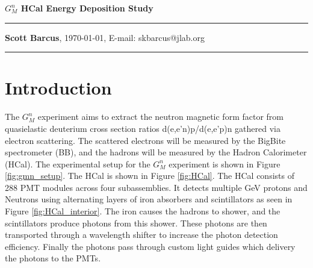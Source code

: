 \documentclass[10pt]{article}
\date{}
\begin{document}
\begin{flushleft}
{\Large
\textbf{$G_M^n$ HCal Energy Deposition Study}
}
\\
\vspace{4mm}
\hrule height 0.8pt \relax
\vspace{2mm}
\textbf{Scott Barcus}, \today, E-mail: skbarcus@jlab.org
\end{flushleft}
\vspace{-2mm}
\hrule height 0.8pt \relax
\vspace{6mm}

\setlength{\parindent}{0.5cm}


\section{Introduction}

The $G_M^n$ experiment aims to extract the neutron magnetic form factor from quasielastic deuterium cross section ratios d(e,e'n)p/d(e,e'p)n gathered via electron scattering. The scattered electrons will be measured by the BigBite spectrometer (BB), and the hadrons will be measured by the Hadron Calorimeter (HCal). The experimental setup for the $G_M^n$ experiment is shown in Figure \ref{fig:gmn_setup}. The HCal is shown in Figure \ref{fig:HCal}. The HCal consists of 288 PMT modules across four subassemblies. It detects multiple GeV protons and Neutrons using alternating layers of iron absorbers and scintillators as seen in Figure \ref{fig:HCal_interior}. The iron causes the hadrons to shower, and the scintillators produce photons from this shower. These photons are then transported through a wavelength shifter to increase the photon detection efficiency. Finally the photons pass through custom light guides which delivery the photons to the PMTs. \\
\end{document}

